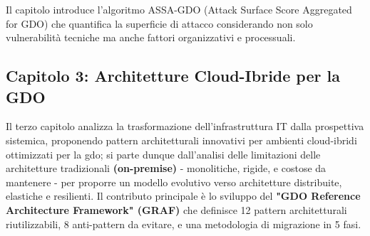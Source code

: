 Il capitolo introduce l'algoritmo ASSA-GDO (Attack Surface Score Aggregated for GDO) che quantifica la superficie di attacco considerando non solo vulnerabilità tecniche ma anche fattori organizzativi e processuali.


      
      



\subsection{Capitolo 3: Architetture Cloud-Ibride per la GDO}

\label{ssec:struttura_cap3}
Il terzo capitolo analizza la trasformazione dell'infrastruttura IT dalla prospettiva sistemica, proponendo pattern architetturali innovativi per ambienti cloud-ibridi ottimizzati per la \gls{gdo}; si parte dunque dall'analisi delle limitazioni delle architetture tradizionali \textbf{(on-premise)} - monolitiche, rigide, e costose da mantenere - per proporre un modello evolutivo verso architetture distribuite, elastiche e resilienti. Il contributo principale è lo sviluppo del \textbf{"GDO Reference Architecture Framework" (GRAF)} che definisce 12 pattern architetturali riutilizzabili, 8 anti-pattern da evitare, e una metodologia di migrazione in 5 fasi.

